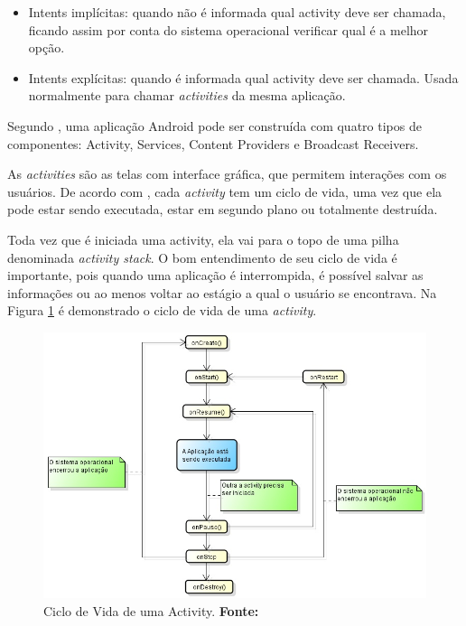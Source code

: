 	\begin{itemize}
	  
	  \item Intents implícitas: quando não é informada qual activity deve ser
	  chamada, ficando assim por conta do sistema operacional verificar qual é a
	  melhor opção.
	  
	  \item Intents explícitas: quando é informada qual activity deve ser chamada.
	  Usada normalmente para chamar \textit{activities} da mesma aplicação.
	  
	\end{itemize}
	
	\par Segundo , uma aplicação Android pode ser construída
com quatro tipos de componentes: Activity, Services, Content Providers e
Broadcast Receivers.

	\par As \textit{activities} são as telas com interface gráfica, que permitem
interações com os usuários. De acordo com , cada
\textit{activity} tem um ciclo de vida, uma vez que ela pode estar sendo
executada, estar em segundo plano ou totalmente destruída.

	\par Toda vez que é iniciada uma activity, ela vai para o topo de uma pilha
denominada \textit{activity stack}. O bom entendimento de seu ciclo de vida é
importante, pois quando uma aplicação é interrompida, é possível salvar as
informações ou ao menos voltar ao estágio a qual o usuário se encontrava. Na
Figura \ref{fig:qt1} é demonstrado o ciclo de vida de uma \textit{activity}.

	\begin{figure}[h!]
		\centerline{\includegraphics[scale=0.8]{./imagens/1_q_teorico/qt1.png}}
		\caption[Ciclo de Vida de uma Activity]{Ciclo de Vida de uma
		Activity.
		 \textbf{Fonte:}}
		\label{fig:qt1}
	\end{figure}

